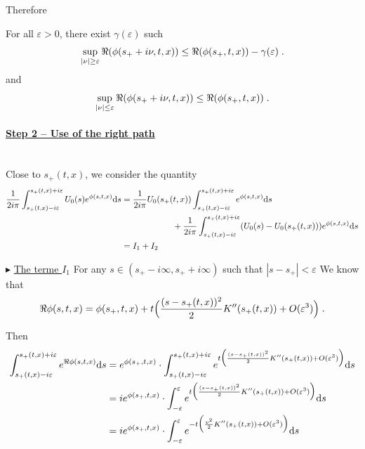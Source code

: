 \documentclass[11pt]{amsart}
\newcommand{\ul}[1]{\underline{#1}}
\begin{document}
Therefore
\begin{lemma} For all $\varepsilon > 0$, there exist $\gamma(\varepsilon)$ such
    \begin{equation}
        \sup_{|\nu| \geq \varepsilon } \Re(\phi(s_+ + i \nu, t, x)) \leq \Re(\phi(s_+, t, x)) - \gamma(\varepsilon)
        \; .
    \end{equation}
and
    \begin{equation}
        \sup_{|\nu| \leq \varepsilon } \Re(\phi(s_+ + i \nu, t, x)) \leq \Re(\phi(s_+, t, x))
        \; .
    \end{equation}
\end{lemma}

\paragraph{\ul{Step 2 -- Use of the right path}} \text{}\\

Close to $s_+(t,x)$, we consider the quantity
    \begin{align*}
    \frac{1}{2i \pi} \int_{s_+(t,x) - i\varepsilon}^{s_+(t,x) + i\varepsilon} U_0(s) e^{\phi(s,t,x)} \mathrm ds 
    &=
    \frac{1}{2i \pi} U_0(s_+(t,x)) \int_{s_+(t,x) - i\varepsilon}^{s_+(t,x) + i\varepsilon} e^{\phi(s,t,x)} \mathrm ds
    \\
    & \qquad \qquad \qquad+ 
    \frac{1}{2i \pi} \int_{s_+(t,x) - i\varepsilon}^{s_+(t,x) + i\varepsilon} (U_0(s) -  U_0(s_+(t,x)))  e^{\phi(s,t,x)} \mathrm ds \\
    &= I_1 + I_2
    \end{align*}
    
$\blacktriangleright$ \ul{The terme $I_1$}
For any $s \in (s_+ - i \infty, s_+ + i \infty)$ such that $|s - s_+| < \varepsilon$
We know that 
    \begin{equation}
        \Re \phi(s, t, x) = \phi(s_+, t, x) + t \Big(\frac{(s - s_+(t,x))^2}{2} K''(s_+(t,x)) + O(\varepsilon^3)\Big)
        \; .
    \end{equation}

Then 
\begin{align*}
   \int_{s_+(t,x) - i\varepsilon}^{s_+(t,x) + i\varepsilon} e^{\Re \phi(s,t,x)} \mathrm ds
    &=
    e^{\phi(s_+, t, x)} \cdot \int_{s_+(t,x) - i\varepsilon}^{s_+(t,x) + i\varepsilon} e^{t \Big(\frac{(s - s_+(t,x))^2}{2} K''(s_+(t,x)) + O(\varepsilon^3)\Big)} \mathrm ds \\
    &= 
     i e^{\phi(s_+, t, x)} \cdot \int_{- \varepsilon}^{\varepsilon} e^{t \Big(\frac{(s - s_+(t,x))^2}{2} K''(s_+(t,x)) + O(\varepsilon^3)\Big)} \mathrm ds \\
    &= 
     i e^{\phi(s_+, t, x)} \cdot \int_{- \varepsilon}^{\varepsilon} e^{- t \Big(\frac{v^2}{2} K''(s_+(t,x)) + O(\varepsilon^3)\Big)} \mathrm ds 
\end{align*}
\end{document}
